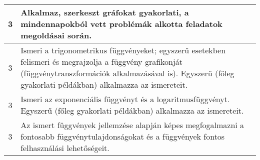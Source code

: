 \begin{longtable}{c | p{} }
                                
                                          3 &  Alkalmaz, szerkeszt gráfokat gyakorlati, a mindennapokból vett problémák alkotta feladatok megoldásai során. \\ \hline
                                          3 &  Ismeri a trigonometrikus függvényeket; egyszerű esetekben felismeri és megrajzolja a függvény grafikonját (függvénytranszformációk alkalmazásával is). Egyszerű (főleg gyakorlati példákban) alkalmazza az ismereteit. \\ \hline
                                          3 &  Ismeri az exponenciális függvényt és a logaritmusfüggvényt. Egyszerű (főleg gyakorlati példákban) alkalmazza az ismereteit. \\ \hline
                                          3 &  Az ismert függvények jellemzése alapján képes megfogalmazni a fontosabb függvénytulajdonságokat és a függvények fontos felhasználási lehetőségeit. \\ \hline
                                      

\end{longtable}
